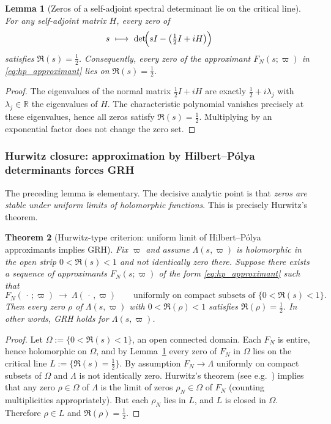 \documentclass[11pt,oneside]{amsbook}
\numberwithin{equation}{section}
\theoremstyle{plain}
\newtheorem{theorem}{Theorem}[section]
\newtheorem{lemma}[theorem]{Lemma}
\theoremstyle{definition}
\theoremstyle{remark}
\newcommand{\R}{\mathbb{R}}
\begin{document}
\begin{lemma}[Zeros of a self-adjoint spectral determinant lie on the critical line]
\label{lem:zeros_on_critical_line_finite}
For any self-adjoint matrix $H$, every zero of
\[
s\ \longmapsto\ \det\!\Bigl(sI-\bigl(\tfrac12 I+iH\bigr)\Bigr)
\]
satisfies $\Re(s)=\tfrac12$.
Consequently, every zero of the approximant $F_N(s;\varpi)$ in \eqref{eq:hp_approximant} lies on $\Re(s)=\tfrac12$.
\end{lemma}

\begin{proof}
The eigenvalues of the normal matrix $\tfrac12 I+iH$ are exactly $\tfrac12+i\lambda_j$ with $\lambda_j\in\R$ the eigenvalues of $H$.
The characteristic polynomial vanishes precisely at these eigenvalues, hence all zeros satisfy $\Re(s)=\tfrac12$.
Multiplying by an exponential factor does not change the zero set.
\end{proof}

\subsubsection{Hurwitz closure: approximation by Hilbert--Pólya determinants forces GRH}

The preceding lemma is elementary.
The decisive analytic point is that \emph{zeros are stable under uniform limits of holomorphic functions}.
This is precisely Hurwitz's theorem.

\begin{theorem}[Hurwitz-type criterion: uniform limit of Hilbert--Pólya approximants implies GRH]
\label{thm:hurwitz_hp_implies_grh}
Fix $\varpi$ and assume $\Lambda(s,\varpi)$ is holomorphic in the open strip $0<\Re(s)<1$ and not identically zero there.
Suppose there exists a sequence of approximants $F_N(s;\varpi)$ of the form \eqref{eq:hp_approximant} such that
\[
F_N(\,\cdot\,;\varpi)\ \longrightarrow\ \Lambda(\,\cdot\,,\varpi)
\qquad\text{uniformly on compact subsets of }\{0<\Re(s)<1\}.
\]
Then every zero $\rho$ of $\Lambda(s,\varpi)$ with $0<\Re(\rho)<1$ satisfies $\Re(\rho)=\tfrac12$.
In other words, GRH holds for $\Lambda(s,\varpi)$.
\end{theorem}

\begin{proof}
Let $\Omega:=\{0<\Re(s)<1\}$, an open connected domain.
Each $F_N$ is entire, hence holomorphic on $\Omega$, and by Lemma~\ref{lem:zeros_on_critical_line_finite} every zero of $F_N$ in $\Omega$ lies on the critical line $L:=\{ \Re(s)=\tfrac12\}$.
By assumption $F_N\to \Lambda$ uniformly on compact subsets of $\Omega$ and $\Lambda$ is not identically zero.
Hurwitz's theorem (see e.g.\ \cite[Ch.~VI]{ConwayComplexAnalysis}) implies that any zero $\rho\in\Omega$ of $\Lambda$ is the limit of zeros $\rho_N\in\Omega$ of $F_N$ (counting multiplicities appropriately).
But each $\rho_N$ lies in $L$, and $L$ is closed in $\Omega$.
Therefore $\rho\in L$ and $\Re(\rho)=\tfrac12$.
\end{proof}
\end{document}
